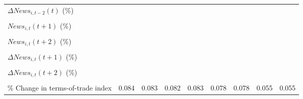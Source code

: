 {\begin{tabular}{l*{8}{c}}
\addlinespace
$ \Delta News_{i,t-2}(t)$ (\%)&                     &                     &                     &                     &                     &                     &                     &                     \\
                    &                     &                     &                     &                     &                     &                     &                     &                     \\
\addlinespace
$ News_{i,t}(t+1)$ (\%)&                     &                     &                     &                     &                     &                     &                     &                     \\
                    &                     &                     &                     &                     &                     &                     &                     &                     \\
\addlinespace
$ News_{i,t}(t+2)$ (\%)&                     &                     &                     &                     &                     &                     &                     &                     \\
                    &                     &                     &                     &                     &                     &                     &                     &                     \\
\addlinespace
$ \Delta News_{i,t}(t+1)$ (\%)&                     &                     &                     &                     &                     &                     &                     &                     \\
                    &                     &                     &                     &                     &                     &                     &                     &                     \\
\addlinespace
$ \Delta News_{i,t}(t+2)$ (\%)&                     &                     &                     &                     &                     &                     &                     &                     \\
                    &                     &                     &                     &                     &                     &                     &                     &                     \\
\addlinespace
\% Change in terms-of-trade index&       0.084         &       0.083         &       0.082         &       0.083         &       0.078         &       0.078         &       0.055         &       0.055         \\

\end{tabular}}
